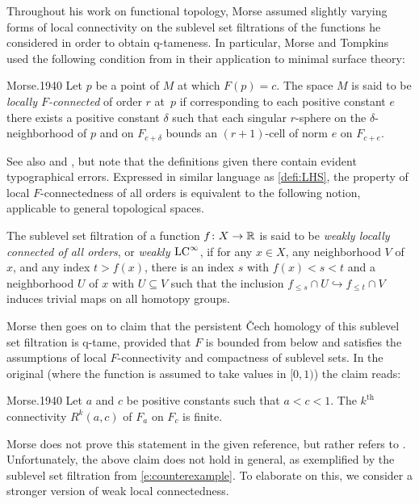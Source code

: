 Throughout his work on functional topology, Morse assumed slightly varying forms of local connectivity on the sublevel set filtrations of the functions he considered in order to obtain \mbox{q-tameness}.
In particular, Morse and Tompkins used the following condition from \cite{Morse.1938,Morse.1940} in their application to minimal surface theory:
\begin{displaycquote}[p.~431]{Morse.1940}
	Let $p$ be a point of $M$ at which $F(p)=c$.
	The space $M$ is said to be \emph{locally $F$-connected} of order $r$ at~$p$ if corresponding to each positive constant $e$ there exists a positive constant $\delta$ such that each singular $r$-sphere on the $\delta$-neighborhood of $p$ and on $F_{c+\delta}$ bounds an $(r+1)$-cell of norm $e$ on $F_{c+e}$.
\end{displaycquote}
See also \cite[p.~ 25]{Morse.1938} and \cite[p.~464]{Morse.1939}, but note that the definitions given there contain evident typographical errors.
Expressed in similar language as \cref{defi:LHS}, the property of local $F$-connectedness of all orders is equivalent to the following notion, applicable to general topological spaces.

\begin{defi}
	The sublevel set filtration of a function $f \colon X \to \mathbb{R}$ is said to be \emph{weakly locally connected of all orders}, or \emph{weakly $\mathrm{LC}^\infty$}, if for any $x \in X$, any neighborhood $V$ of $x$, and any index $t > f(x)$, there is an index $s$ with $f(x) < s < t$ and a neighborhood $U$ of $x$ with $U \subseteq V$ such that the inclusion $f_{\leq s} \cap U \hookrightarrow f_{\leq t} \cap V$ induces trivial maps on all homotopy groups.
\end{defi}

Morse then goes on to claim that the persistent \v{C}ech homology of this sublevel set filtration is q-tame, provided that $F$ is bounded from below and satisfies the assumptions of local $F$-connectivity and compactness of sublevel sets.
In the original (where the function is assumed to take values in $[0,1)$) the claim reads:
\begin{displaycquote}[Theorem 6.3, p.~432]{Morse.1940}
	Let $a$ and $c$ be positive constants such that $a < c < 1$.
	The $k^{\mathrm{th}}$ connectivity $R^k(a,c)$ of $F_a$ on $F_c$ is finite.
\end{displaycquote}
Morse does not prove this statement in the given reference, but rather refers to \cite[Theorem~6.1]{Morse.1938}.
Unfortunately, the above claim does not hold in general, as exemplified by the sublevel set filtration from \cref{e:counterexample}.
To elaborate on this, we consider a stronger version of weak local connectedness.

